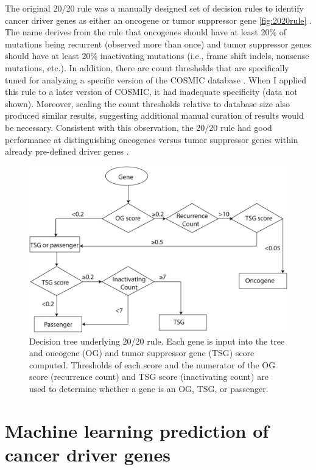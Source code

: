 The original 20/20 rule was a manually designed set of decision rules to identify cancer driver genes as either an oncogene or tumor suppressor gene \autoref{fig:2020rule} \cite{RN25}. The name derives from the rule that oncogenes should have at least 20\% of mutations being recurrent (observed more than once) and tumor suppressor genes should have at least 20\% inactivating mutations (i.e., frame shift indels, nonsense mutations, etc.). In addition, there are count thresholds that are specifically tuned for analyzing a specific version of the COSMIC database \cite{RN95}. When I applied this rule to a later version of COSMIC, it had inadequate specificity (data not shown). Moreover, scaling the count thresholds relative to database size also produced similar results, suggesting additional manual curation of results would be necessary. Consistent with this observation, the 20/20 rule had good performance at distinguishing oncogenes versus tumor suppressor genes within already pre-defined driver genes \cite{RN88}.

\begin{figure}
  \centering
  \makeatletter
  \let\@currsize\normalsize
  \includegraphics[width=0.9\linewidth]{figures/chapter3/2020_rule.jpg}
  \caption{Decision tree underlying 20/20 rule. Each gene is input into the tree and oncogene (OG) and tumor suppressor gene (TSG) score computed. Thresholds of each score and the numerator of the OG score (recurrence count) and TSG score (inactivating count) are used to determine whether a gene is an OG, TSG, or passenger.}
  \label{fig:2020rule}
\end{figure}

\section{Machine learning prediction of cancer driver genes}

